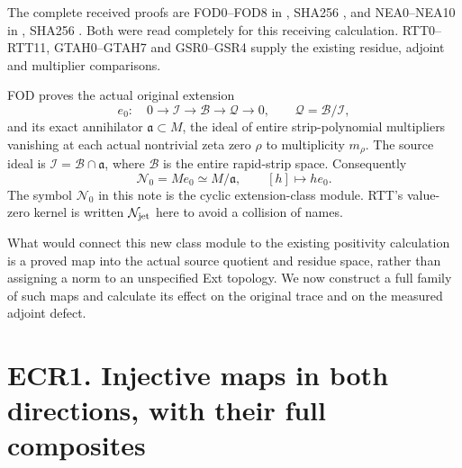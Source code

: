 The complete received proofs are FOD0--FOD8 in
\href{https://github.com/KokunoYumeto/zeta-function-research-reader/blob/36a82ecca98addb8a98b48204e349737856c7223/workbenches/splitzero-tandem/continuations/20260924-cohomology-weight-and-character-lifts/gct-weight-control/proofs/CC_FULL_SOURCE_OBSTRUCTION_DECOMPOSITION.md}{},
SHA256
,
and NEA0--NEA10 in
\href{https://github.com/KokunoYumeto/zeta-function-research-reader/blob/36a82ecca98addb8a98b48204e349737856c7223/workbenches/splitzero-tandem/continuations/20260924-cohomology-weight-and-character-lifts/gct-weight-control/proofs/CC_NORMAL_EXTENSION_ANNIHILATOR.md}{},
SHA256
.
Both were read completely for this receiving calculation. RTT0--RTT11,
GTAH0--GTAH7 and GSR0--GSR4 supply the existing residue, adjoint and
multiplier comparisons.

FOD proves the actual original extension \[
e_0:\quad0\longrightarrow\mathcal I\longrightarrow\mathcal B
\longrightarrow\mathcal Q\longrightarrow0,
\qquad \mathcal Q=\mathcal B/\mathcal I,
\tag{ECR0.1}
\] and its exact annihilator \(\mathfrak a\subset M\), the ideal of
entire strip-polynomial multipliers vanishing at each actual nontrivial
zeta zero \(\rho\) to multiplicity \(m_\rho\). The source ideal is
\(\mathcal I=\mathcal B\cap\mathfrak a\), where \(\mathcal B\) is the
entire rapid-strip space. Consequently \[
\mathscr N_0=M e_0\simeq M/\mathfrak a,\qquad [h]\longmapsto h e_0.
\tag{ECR0.2}
\] The symbol \(\mathscr N_0\) in this note is the cyclic
extension-class module. RTT's value-zero kernel is written
\(\mathcal N_{\rm jet}\) here to avoid a collision of names.

What would connect this new class module to the existing positivity
calculation is a proved map into the actual source quotient and residue
space, rather than assigning a norm to an unspecified Ext topology. We
now construct a full family of such maps and calculate its effect on the
original trace and on the measured adjoint defect.

\section{ECR1. Injective maps in both directions, with their full
composites}\label{ecr1.-injective-maps-in-both-directions-with-their-full-composites}


